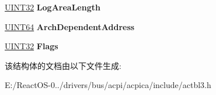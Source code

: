 \begin{DoxyCompactItemize}
\item 
\mbox{\label{structacpi__table__drtm_a92d38bff9b3a34199fceb5eab527546b}} 
\hyperlink{_processor_bind_8h_ae1e6edbbc26d6fbc71a90190d0266018}{U\+I\+N\+T32} {\bfseries Log\+Area\+Length}
\item 
\mbox{\label{structacpi__table__drtm_a976cb8ea96249bfb6803a08ec3e21529}} 
\hyperlink{_processor_bind_8h_a57be03562867144161c1bfee95ca8f7c}{U\+I\+N\+T64} {\bfseries Arch\+Dependent\+Address}
\item 
\mbox{\label{structacpi__table__drtm_a294f0df0b35c861a5093fae17a9aef0d}} 
\hyperlink{_processor_bind_8h_ae1e6edbbc26d6fbc71a90190d0266018}{U\+I\+N\+T32} {\bfseries Flags}
\end{DoxyCompactItemize}


该结构体的文档由以下文件生成\+:\begin{DoxyCompactItemize}
\item 
E\+:/\+React\+O\+S-\/0../drivers/bus/acpi/acpica/include/actbl3.\+h\end{DoxyCompactItemize}
